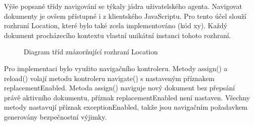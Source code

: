 Výše popsané třídy navigování se týkaly jádra uživatelského agenta. Navigovat dokumenty je ovšem přístupné i z klientského JavaScriptu. Pro tento účel slouží rozhraní Location, které bylo také zcela implementováno (kód xy). Každý dokument procházecího kontextu vlastní unikátní instanci tohoto rozhraní.
 
\begin{figure}[H]
  \begin{center}
    \caption{Diagram tříd znázorňující rozhraní Location}
    \label{Figure.Location}
  \end{center}
\end{figure}
 
Pro implementaci bylo využito navigačního kontroleru. Metody assign() a reload() volají metodu kontroleru navigate() s nastaveným příznakem replacementEnabled. Metoda assign() naviguje nový dokument bez přepsání právě aktivního dokumentu, příznak replacementEnabled není nastaven. Všechny metody nastavují příznak exceptionEnabled, takže jsou navigačním požadavkem generovány bezpečnostní výjimky.


